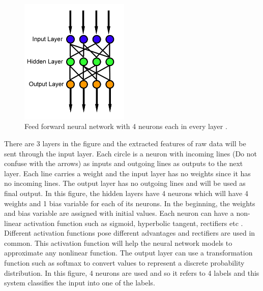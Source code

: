 \documentclass[a4paper, 11pt]{article}
\begin{document}
\begin{figure}[htpb]
    \centering
    \includegraphics[height=6cm,keepaspectratio=true]
    {Feed_forward_neural_net.png}
    \caption{
        Feed forward neural network with 4 neurons each in every layer \cite{WikipediaEN_FeedForward_Network}.
    }
    \label{fig:Feed forward neural network}
\end{figure}

There are 3 layers in the figure and the extracted features of raw data will be sent through the input layer. Each circle is a neuron with incoming lines (Do not confuse with the arrows) as inputs and outgoing lines as outputs to the next layer. Each line carries a weight and the input layer has no weights since it has no incoming lines. The output layer has no outgoing lines and will be used as final output. In this figure, the hidden layers have 4 neurons which will have 4 weights and 1 bias variable for each of its neurons. In the beginning, the weights and bias variable are assigned with initial values. Each neuron can have a non-linear activation function such as sigmoid, hyperbolic tangent, rectifiers etc \cite{Goldberg2016}. Different activation functions pose different advantages and rectifiers are used in common. This activation function will help the neural network models to approximate any nonlinear function. The output layer can use a transformation function such as softmax to convert values to represent a discrete probability distribution. In this figure, 4 neurons are used and so it refers to 4 labels and this system classifies the input into one of the labels.
\end{document}
